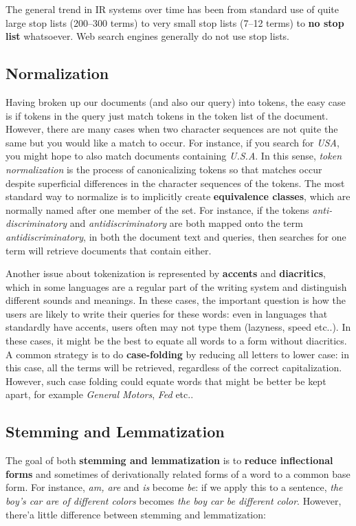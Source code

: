 The general trend in IR systems over time has been from standard use of quite large stop lists (200–300 terms) to very small stop lists (7–12 terms) to \textbf{no stop list} whatsoever. Web search engines generally do not use stop lists.

\subsection{Normalization}
Having broken up our documents (and also our query) into tokens, the easy case is if tokens in the query just match tokens in the token list of the document. However, there are many cases when two character sequences are not quite the same but you would like a match to occur. For instance, if you search for \textit{USA}, you might hope to also match documents containing \textit{U.S.A}. In this sense, \textit{token normalization} is the process of canonicalizing tokens so that matches occur despite superficial differences in the character sequences of the tokens. The most standard way to normalize is to implicitly create \textbf{equivalence classes}, which are normally named after one member of the set. For instance, if the tokens \textit{anti-discriminatory} and \textit{antidiscriminatory} are both mapped onto the term \textit{antidiscriminatory}, in both the document text and queries, then searches for one term will retrieve documents that contain either. 

Another issue about tokenization is represented by \textbf{accents} and \textbf{diacritics}, which in some languages are a regular part of the writing system and distinguish different sounds and meanings. In these cases, the important question is how the users are likely to write their queries for these words: even in languages that standardly have accents, users often may not type them (lazyness, speed etc..). In these cases, it might be the best to equate all words to a form without diacritics. A common strategy is to do \textbf{case-folding} by reducing all letters to lower case: in this case, all the terms will be retrieved, regardless of the correct capitalization. However, such case folding could equate words that might be better be kept apart, for example \textit{General Motors}, \textit{Fed} etc..

\subsection{Stemming and Lemmatization}
The goal of both \textbf{stemming and lemmatization} is to \textbf{reduce inflectional forms} and sometimes of derivationally related forms of a word to a common base form. For instance, \textit{am, are} and \textit{is} become \textit{be}: if we apply this to a sentence, \textit{the boy's car are of different colors} becomes \textit{the boy car be different color}. However, there'a little difference between stemming and lemmatization:

